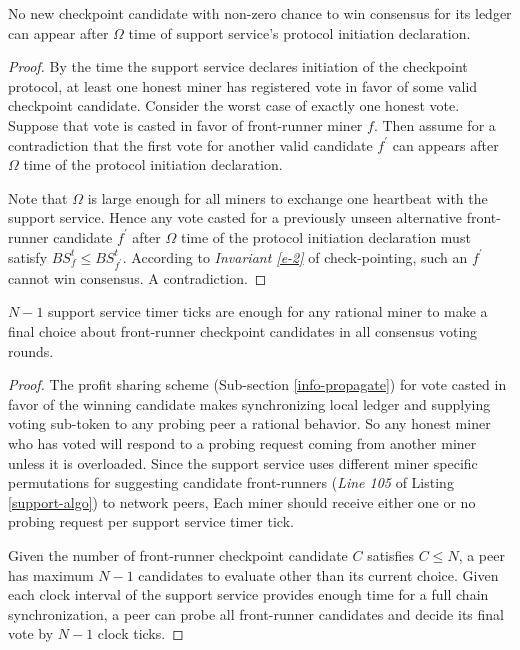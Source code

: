 \begin{lemma}
\label{l-cand-list}
No new checkpoint candidate with non-zero chance to win consensus for its ledger can appear after $\Omega$ time of support service's protocol initiation declaration.     
\end{lemma}
\begin{proof}
By the time the support service declares initiation of the checkpoint protocol, at least one honest miner has registered vote in favor of some valid checkpoint candidate. Consider the worst case of exactly one honest vote. Suppose that vote is casted in favor of front-runner miner $f$. Then assume for a contradiction that the first vote for another valid candidate $f^\prime$ can appears after $\Omega$ time of the protocol initiation declaration. 

Note that $\Omega$ is large enough for all miners to exchange one heartbeat with the support service. Hence any vote casted for a previously unseen alternative front-runner candidate $f^\prime$ after $\Omega$ time of the protocol initiation declaration must satisfy $BS_f^t \leq BS_{f^\prime}^t$. According to \textit{Invariant \ref{e-2}} of check-pointing, such an $f^\prime$ cannot win consensus. A contradiction.  
\end{proof}

\begin{lemma}
\label{l-round-time}
$N - 1$ support service timer ticks are enough for any rational miner to make a final choice about front-runner checkpoint candidates in all consensus voting rounds.   
\end{lemma}
\begin{proof}
The profit sharing scheme (Sub-section \ref{info-propagate}) for vote casted in favor of the winning candidate makes synchronizing local ledger and supplying voting sub-token to any probing peer a rational behavior. So any honest miner who has voted will respond to a probing request coming from another miner unless it is overloaded. Since the support service uses different miner specific permutations for suggesting candidate front-runners (\textit{Line 105} of Listing \ref{support-algo}) to network peers, Each miner should receive either one or no probing request per support service timer tick.

Given the number of front-runner checkpoint candidate $C$ satisfies $C \leq N$, a peer has maximum $N - 1$ candidates to evaluate other than its current choice. Given each clock interval of the support service provides enough time for a full chain synchronization, a peer can probe all front-runner candidates and decide its final vote by $N - 1$ clock ticks.         
\end{proof}


